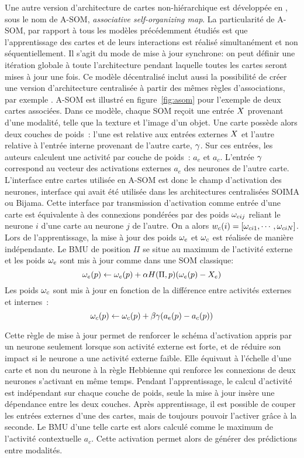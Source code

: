 \documentclass[../main]{subfiles}
\begin{document}
{Une autre version d'architecture de cartes non-hiérarchique est développée en \cite{johnsson_associating_2008,johnsson_associative_2009}, sous le nom de A-SOM, \emph{associative self-organizing map}. 
La particularité de A-SOM, par rapport à tous les modèles précédemment étudiés est que l'apprentissage des cartes et de leurs interactions est réalisé simultanément et non séquentiellement. Il s'agit du mode de mise à jour synchrone: on peut définir une itération globale à toute l'architecture pendant laquelle toutes les cartes seront mises à jour une fois.
Ce modèle décentralisé inclut aussi la possibilité de créer une version d'architecture centralisée à partir des mêmes règles d'associations, par exemple \cite{buonamente_hierarchies_2016}. A-SOM est illustré en figure~\ref{fig:asom} pour l'exemple de deux cartes associées. 
Dans ce modèle, chaque SOM reçoit une entrée $X$ provenant d'une modalité, telle que la texture et l'image d'un objet.
Une carte possède alors deux couches de poids~: l'une est relative aux entrées externes $X$ et l'autre relative à l'entrée interne provenant de l'autre carte, $\gamma$.
Sur ces entrées, les auteurs calculent une activité par couche de poids~: $a_e$ et $a_c$.
L'entrée $\gamma$ correspond au vecteur des activations externes $a_e$ des neurones de l'autre carte.
L'interface entre cartes utilisée en A-SOM est donc le champ d'activation des neurones, interface qui avait été utilisée dans les architectures centralisées SOIMA ou Bijama. Cette interface par transmission d'activation comme entrée d'une carte est équivalente à des connexions pondérées par des poids $\omega_{cij}$ reliant le neurone $i$ d'une carte au neurone $j$ de l'autre. On a alors $w_c(i) = [\omega_{ci1}, \cdots, \omega_{ciN}]$.
Lors de l'apprentissage, la mise à jour des poids $\omega_e$ et $\omega_c$ est réalisée de manière indépendante. 
Le BMU de position $\Pi$ se situe au maximum de l'activité externe et les poids $\omega_e$ sont mis à jour comme dans une SOM classique:
$$ \omega_e(p) \leftarrow \omega_e(p) + \alpha H(\Pi,p)(\omega_e(p) - X_e )$$
Les poids $\omega_c$ sont mis à jour en fonction de la différence entre activités externes et internes~:
$$ \omega_c(p) \leftarrow \omega_c(p) + \beta \gamma (a_e(p) - a_c(p))$$

Cette règle de mise à jour permet de renforcer le schéma d'activation appris par un neurone seulement lorsque son activité externe est forte, et de réduire son impact si le neurone a une activité externe faible. Elle équivaut à l'échelle d'une carte et non du neurone à la règle Hebbienne qui renforce les connexions de deux neurones s'activant en même temps.
Pendant l'apprentissage, le calcul d'activité est indépendant sur chaque couche de poids, seule la mise à jour insère une dépendance entre les deux couches.
Après apprentissage, il est possible de couper les entrées externes d'une des cartes, mais de toujours pouvoir l'activer grâce à la seconde. Le BMU d'une telle carte est alors calculé comme le maximum de l'activité contextuelle $a_c$. Cette activation permet alors de générer des prédictions entre modalités.

}
\end{document}
